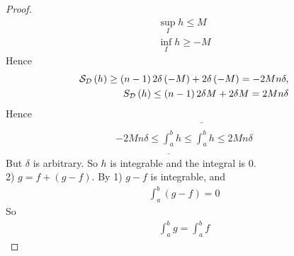 \documentclass[a4paper]{article}
\begin{document}
\begin{prop}
\begin{proof}
\begin{equation*}
\begin{aligned}
\sup_I h \leq M\\
\inf_I h \geq -M
\end{aligned}
\end{equation*}
Hence
\begin{equation*}
\begin{aligned}
\mathcal{S}_{\mathcal{D}} \left(h\right) \geq \left(n-1\right) 2\delta \left(-M\right) + 2\delta \left(-M\right) = -2Mn\delta,\\
S_{\mathcal{D}} \left(h\right) \leq \left(n-1\right)2\delta M + 2\delta M = 2Mn \delta
\end{aligned}
\end{equation*}
Hence
\begin{equation*}
\begin{aligned}
-2Mn\delta \leq \underline{\int_a^b}h \leq \bar{\int_a^b} h \leq 2Mn\delta
\end{aligned}
\end{equation*}
But $\delta$ is arbitrary. So $h$ is integrable and the integral is 0.\\
2) $g=f+\left(g-f\right)$. By 1) $g-f$ is integrable, and
\begin{equation*}
\begin{aligned}
\int_a^b \left(g-f\right) = 0
\end{aligned}
\end{equation*}
So
\begin{equation*}
\begin{aligned}
\int_a^b g = \int_a^b f
\end{aligned}
\end{equation*}
\end{proof}
\end{prop}
\end{document}
